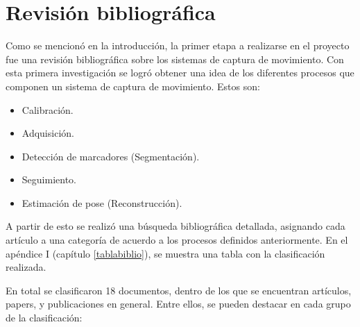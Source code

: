 \section{Revisión bibliográfica}
\label{invBiblio}

Como se mencionó en la introducción, la primer etapa a realizarse en el proyecto fue una revisión bibliográfica sobre los sistemas de captura de movimiento. Con esta primera investigación se logró obtener una idea de los diferentes procesos que componen un sistema de captura de movimiento. Estos son:

\begin{itemize}
	\item Calibración.
	\item Adquisición.
	\item Detección de marcadores (Segmentación).
	\item Seguimiento.
	\item Estimación de pose (Reconstrucción).
\end{itemize}

A partir de esto se realizó una búsqueda bibliográfica detallada, asignando cada artículo a una categoría de acuerdo a los procesos definidos anteriormente. En el apéndice I (capítulo \ref{tablabiblio}), se muestra una tabla con la clasificación realizada.

En total se clasificaron 18 documentos, dentro de los que se encuentran artículos, papers, y publicaciones en general. Entre ellos, se pueden destacar en cada grupo de la clasificación:


